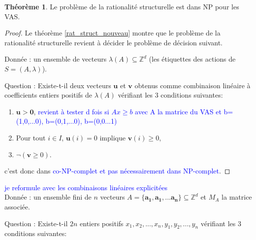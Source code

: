 \documentclass[a4paper,final]{article}
\theoremstyle{definition}
\newtheorem{Theorem}{Théorème}
\let\geq\geqslant
\newcommand{\alain}[1]{\textcolor{blue}{#1}}
\newcommand{\Z}{\ensuremath{\mathbb{Z}}}
\newcommand{\vect}[1]{\ensuremath{\mathbf{#1}}}
\begin{document}
\begin{Theorem}\label{NP conf_struct_rat}
Le  problème de la rationalité structurelle est dans NP pour les VAS.
\end{Theorem}

\begin{proof}
Le théorème \ref{rat_struct_nouveau} montre que le problème de la rationalité structurelle revient à décider le problème de décision suivant.

Donnée : un ensemble de vecteurs $\lambda(A) \subseteq \Z^d$ (les étiquettes des actions de $S = (A,\lambda)$).

Question : Existe-t-il deux vecteurs $\vect{u}$ et $\vect{v}$ obtenus comme combinaison linéaire à coefficients entiers positifs de $\lambda(A)$ vérifiant les 3 conditions suivantes:

\begin{enumerate}
    \item $\vect{u} > \vect{0}$, 
\alain{revient à tester d fois si $Ax\geq b$ avec A la matrice du VAS et b=(1,0,...0), b=(0,1,...0), b=(0,0...1)}
    \item Pour tout $i \in I$, $\vect{u}(i)=0$ implique 
$\vect{v}(i) \geq 0$,
    \item  $\lnot(\vect{v} \geq 0)$. 
\end{enumerate}
c'est donc dans \alain{co-NP-complet et pas nécessairement dans NP-complet}.
\end{proof}

\alain{je reformule avec les combinaisons linéaires explicitées}\\

Donnée : un ensemble fini de $n$ vecteurs $A=\{\vect{a_1}, \vect{a_1},...\vect{a_n}\} \subseteq \Z^d$ et $M_A$ la matrice associée.

Question : Existe-t-il $2n$ entiers positifs $x_1,x_2,...,x_n, y_1,y_2,...,y_n $
%
vérifiant les 3 conditions suivantes:
\end{document}
